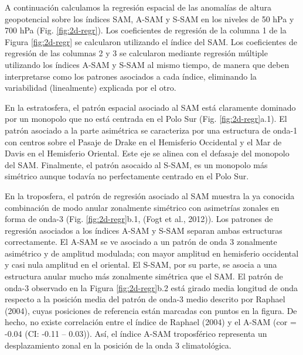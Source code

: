 \documentclass[12pt,oneside]{reedthesis}
\begin{document}
A continuación calculamos la regresión espacial de las anomalías de altura geopotencial sobre los índices SAM, A-SAM y S-SAM en los niveles de 50 hPa y 700 hPa (Fig. \ref{fig:2d-regr}).
Los coeficientes de regresión de la columna 1 de la Figura \ref{fig:2d-regr} se calcularon utilizando el índice del SAM.
Los coeficientes de regresión de las columnas 2 y 3 se calcularon mediante regresión múltiple utilizando los índices A-SAM y S-SAM al mismo tiempo, de manera que deben interpretarse como los patrones asociados a cada índice, eliminando la variabilidad (linealmente) explicada por el otro.

En la estratosfera, el patrón espacial asociado al SAM está claramente dominado por un monopolo que no está centrada en el Polo Sur (Fig. \ref{fig:2d-regr}a.1).
El patrón asociado a la parte asimétrica se caracteriza por una estructura de onda-1 con centros sobre el Pasaje de Drake en el Hemisferio Occidental y el Mar de Davis en el Hemisferio Oriental.
Este eje se alinea con el defasaje del monopolo del SAM.
Finalmente, el patrón asocaido al S-SAM, es un monopolo más simétrico aunque todavía no perfectamente centrado en el Polo Sur.

En la troposfera, el patrón de regresión asociado al SAM muestra la ya conocida combinación de modo anular zonalmente simétrico con asimetrías zonales en forma de onda-3 (Fig. \ref{fig:2d-regr}b.1, (Fogt et al., 2012)).
Los patrones de regresión asociados a los índices A-SAM y S-SAM separan ambas estructuras correctamente.
El A-SAM se ve asociado a un patrón de onda 3 zonalmente asimétrico y de amplitud modulada; con mayor amplitud en hemisferio occidental y casi nula amplitud en el oriental.
El S-SAM, por su parte, se asocia a una estructura anular mucho más zonalmente simétrica que el SAM.
El patrón de onda-3 observado en la Figura \ref{fig:2d-regr}b.2 está girado media longitud de onda respecto a la posición media del patrón de onda-3 medio descrito por Raphael (2004), cuyas posiciones de referencia están marcadas con puntos en la figura.
De hecho, no existe correlación entre el índice de Raphael (2004) y el A-SAM (cor = -0.04 (CI: -0.11 -- 0.03)).
Así, el índice A-SAM troposférico representa un desplazamiento zonal en la posición de la onda 3 climatológica.
\end{document}
